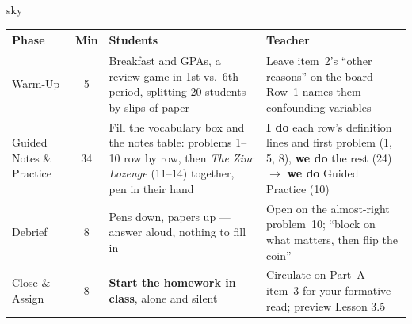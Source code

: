 \documentclass[10pt]{article}
\begin{document}
\boxguard[30]
\begin{skillbox}{sky}
\renewcommand{\arraystretch}{1.25}
\begin{tabularx}{\linewidth}{@{}l c X X@{}}
\textbf{Phase} & \textbf{Min} & \textbf{Students} & \textbf{Teacher} \\
\hline
Warm-Up & 5 & Breakfast and GPAs, a review game in 1st vs.\ 6th period, splitting 20
students by slips of paper & Leave item~2's ``other reasons'' on the board --- Row~1 names them
confounding variables \\
Guided Notes \& Practice & 34 & Fill the vocabulary box and the notes table: problems 1--10 row
by row, then \emph{The Zinc Lozenge} (11--14) together, pen in their hand & \textbf{I do}
each row's definition lines and first problem (1, 5, 8), \textbf{we do} the rest (24)
$\to$ \textbf{we do} Guided Practice (10) \\
Debrief & 8 & Pens down, papers up --- answer aloud, nothing to fill in & Open on the
almost-right problem~10; ``block on what matters, then flip the coin'' \\
Close \& Assign & 8 & \textbf{Start the homework in class}, alone and silent & Circulate on
Part~A item~3 for your formative read; preview Lesson 3.5 \\
\end{tabularx}
\end{skillbox}
\end{document}
